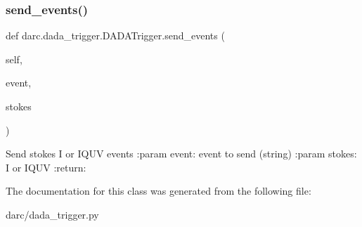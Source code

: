 \subsubsection{\texorpdfstring{send\_events()}{send\_events()}}
{\footnotesize\ttfamily def darc.\+dada\+\_\+trigger.\+D\+A\+D\+A\+Trigger.\+send\+\_\+events (\begin{DoxyParamCaption}\item[{}]{self,  }\item[{}]{event,  }\item[{}]{stokes }\end{DoxyParamCaption})}

\begin{DoxyVerb}Send stokes I or IQUV events
:param event: event to send (string)
:param stokes: I or IQUV
:return: 
\end{DoxyVerb}
 

The documentation for this class was generated from the following file\+:\begin{DoxyCompactItemize}
\item 
darc/dada\+\_\+trigger.\+py\end{DoxyCompactItemize}
